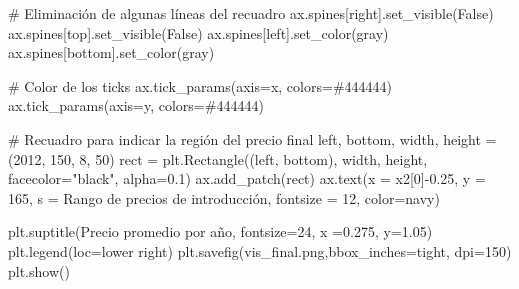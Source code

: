 \documentclass[
  letterpaper,
  DIV=11,
  numbers=noendperiod]{scrreprt}
\newenvironment{Shaded}{\begin{snugshade}}{\end{snugshade}}
\newcommand{\CommentTok}[1]{\textcolor[rgb]{0.37,0.37,0.37}{#1}}
\newcommand{\DecValTok}[1]{\textcolor[rgb]{0.68,0.00,0.00}{#1}}
\newcommand{\FloatTok}[1]{\textcolor[rgb]{0.68,0.00,0.00}{#1}}
\newcommand{\NormalTok}[1]{\textcolor[rgb]{0.00,0.23,0.31}{#1}}
\newcommand{\OperatorTok}[1]{\textcolor[rgb]{0.37,0.37,0.37}{#1}}
\newcommand{\StringTok}[1]{\textcolor[rgb]{0.13,0.47,0.30}{#1}}
\newcommand{\VariableTok}[1]{\textcolor[rgb]{0.07,0.07,0.07}{#1}}
\begin{document}
\begin{Shaded}
\begin{Highlighting}[]
\CommentTok{\# Eliminación de algunas líneas del recuadro}
\NormalTok{ax.spines[}\StringTok{\textquotesingle{}right\textquotesingle{}}\NormalTok{].set\_visible(}\VariableTok{False}\NormalTok{)}
\NormalTok{ax.spines[}\StringTok{\textquotesingle{}top\textquotesingle{}}\NormalTok{].set\_visible(}\VariableTok{False}\NormalTok{)}
\NormalTok{ax.spines[}\StringTok{\textquotesingle{}left\textquotesingle{}}\NormalTok{].set\_color(}\StringTok{\textquotesingle{}gray\textquotesingle{}}\NormalTok{)}
\NormalTok{ax.spines[}\StringTok{\textquotesingle{}bottom\textquotesingle{}}\NormalTok{].set\_color(}\StringTok{\textquotesingle{}gray\textquotesingle{}}\NormalTok{)}

\CommentTok{\# Color de los ticks}
\NormalTok{ax.tick\_params(axis}\OperatorTok{=}\StringTok{\textquotesingle{}x\textquotesingle{}}\NormalTok{, colors}\OperatorTok{=}\StringTok{\textquotesingle{}\#444444\textquotesingle{}}\NormalTok{)}
\NormalTok{ax.tick\_params(axis}\OperatorTok{=}\StringTok{\textquotesingle{}y\textquotesingle{}}\NormalTok{, colors}\OperatorTok{=}\StringTok{\textquotesingle{}\#444444\textquotesingle{}}\NormalTok{)}

\CommentTok{\# Recuadro para indicar la región del precio final}
\NormalTok{left, bottom, width, height }\OperatorTok{=}\NormalTok{ (}\DecValTok{2012}\NormalTok{, }\DecValTok{150}\NormalTok{, }\DecValTok{8}\NormalTok{, }\DecValTok{50}\NormalTok{)}
\NormalTok{rect }\OperatorTok{=}\NormalTok{ plt.Rectangle((left, bottom), width, height,}
\NormalTok{                     facecolor}\OperatorTok{=}\StringTok{"black"}\NormalTok{, alpha}\OperatorTok{=}\FloatTok{0.1}\NormalTok{)}
\NormalTok{ax.add\_patch(rect)}
\NormalTok{ax.text(x }\OperatorTok{=}\NormalTok{ x2[}\DecValTok{0}\NormalTok{]}\OperatorTok{{-}}\FloatTok{0.25}\NormalTok{, y }\OperatorTok{=} \DecValTok{165}\NormalTok{, s }\OperatorTok{=} \StringTok{\textquotesingle{}Rango de precios de introducción\textquotesingle{}}\NormalTok{, fontsize }\OperatorTok{=} \DecValTok{12}\NormalTok{, color}\OperatorTok{=}\StringTok{\textquotesingle{}navy\textquotesingle{}}\NormalTok{)}

\NormalTok{plt.suptitle(}\StringTok{\textquotesingle{}Precio promedio por año\textquotesingle{}}\NormalTok{, fontsize}\OperatorTok{=}\DecValTok{24}\NormalTok{, x }\OperatorTok{=}\FloatTok{0.275}\NormalTok{, y}\OperatorTok{=}\FloatTok{1.05}\NormalTok{)}
\NormalTok{plt.legend(loc}\OperatorTok{=}\StringTok{\textquotesingle{}lower right\textquotesingle{}}\NormalTok{)}
\NormalTok{plt.savefig(}\StringTok{\textquotesingle{}vis\_final.png\textquotesingle{}}\NormalTok{,bbox\_inches}\OperatorTok{=}\StringTok{\textquotesingle{}tight\textquotesingle{}}\NormalTok{, dpi}\OperatorTok{=}\DecValTok{150}\NormalTok{)}
\NormalTok{plt.show()}
\end{Highlighting}
\end{Shaded}
\end{document}
